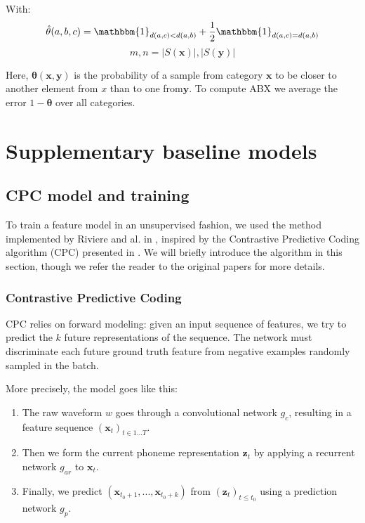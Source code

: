 \documentclass{article}
\begin{document}
With:
\[ \hat{\theta}(a,b,c) = \mathbbm{1}_{d(a,c) < d(a,b)} + \frac{1}{2}  \mathbbm{1}_{d(a,c) = d(a,b)}\]
\[ m, n = |S(\boldsymbol{x})|, |S(\boldsymbol{y})| \]

Here, $\boldsymbol{\theta}(\boldsymbol{x},\boldsymbol{y})$ is the probability of a sample from category $\boldsymbol{x}$ to be closer to another element from $x$ than to one from$\boldsymbol{y}$.
To compute ABX we average the error $1-\boldsymbol{\theta}$ over all categories.

\section{Supplementary baseline models}\label{sec:supbaseline}

\subsection{CPC model and training}

To train a feature model in an unsupervised fashion, we used the method implemented by Riviere and al. in \cite{universal_speech_features}, inspired by the Contrastive Predictive Coding algorithm (CPC) presented in \cite{vandenoord2018}.
We will briefly introduce the algorithm in this section, though we refer the reader to the original papers for more details.

\subsubsection{Contrastive Predictive Coding}

CPC relies on forward modeling: given an input sequence of features, we try to predict the $k$ future representations of the sequence. 
The network must discriminate each future ground truth feature from negative examples randomly sampled in the batch.

More precisely, the model goes like this:
\begin{enumerate}
    \item The raw waveform $w$ goes through a convolutional network $g_c$, resulting in a feature sequence $(\mathbf{x}_t)_{t \in 1... T}$.
    \item Then we form the current phoneme representation $\mathbf{z}_t$ by applying a recurrent network $g_{ar}$ to $\mathbf{x}_t$.
    \item Finally, we predict $(\mathbf{x}_{t_0 +1},..., \mathbf{x}_{t_0 +k})$ from $(\mathbf{z}_t)_{t \leq t_0}$ using a prediction network $g_p$.
\end{enumerate}
\end{document}
